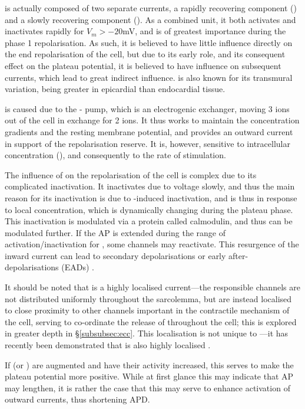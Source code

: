 \documentclass[../thesis-main.tex]{subfiles}
\begin{document}
 \ito{} is actually composed of two separate currents, a rapidly recovering component (\itof{}) and a slowly recovering component (\itos{}). As a combined unit, it both activates and inactivates rapidly for $V_m > -20$mV, and is of greatest importance during the phase 1 repolarisation. As such, it is believed to have little influence directly on the end repolarisation of the cell, but due to its early role, and its consequent effect on the plateau potential, it is believed to have influence on subsequent currents, which lead to great indirect influence. \ito{} is also known for its transmural variation, being greater in epicardial than endocardial tissue.
 
 \inak{} is caused due to the \na{}-\K{} pump, which is an electrogenic exchanger, moving 3 \na{} ions out of the cell in exchange for 2 \K{} ions. It thus works to maintain the concentration gradients and the resting membrane potential, and provides an outward current in support of the repolarisation reserve. It is, however, sensitive to intracellular \na{} concentration (\nai), and consequently to the rate of stimulation.
 
 The influence of \ica{} on the repolarisation of the cell is complex due to its complicated inactivation. It inactivates due to voltage slowly, and thus the main reason for its inactivation is due to \ca{}-induced inactivation, and is thus in response to local \ca{} concentration, which is dynamically changing during the plateau phase. This inactivation is modulated via a protein called calmodulin, and thus can be modulated further. If the AP is extended during the range of activation/inactivation for \ica{}, some \ica{} channels may reactivate. This resurgence of the inward current can lead to secondary depolarisations or early after-depolarisations (EADs) \citep{Carmeliet2006}. 
 
 It should be noted that \ica{} is a highly localised current---the responsible channels are not distributed uniformly throughout the sarcolemma, but are instead localised to close proximity to other channels important in the contractile mechanism of the cell, serving to co-ordinate the release of \ca{} throughout the cell; this is explored in greater depth in \S\ref{subsubsec:ecc}. This localisation is not unique to \ica{}---it has recently been demonstrated that \ina{} is also highly localised \citep{Bhargava2013}.
 
 If \ica{} (or \ina{}) are augmented and have their activity increased, this serves to make the plateau potential more positive. While at first glance this may indicate that AP may lengthen, it is rather the case that this may serve to enhance activation of outward \K{} currents, thus shortening APD.
 
\end{document}
